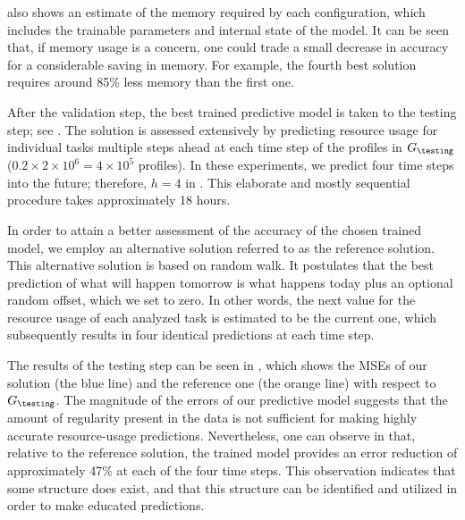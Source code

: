  also shows an estimate of the memory required by each
configuration, which includes the trainable parameters and internal state of the
model. It can be seen that, if memory usage is a concern, one could trade a
small decrease in accuracy for a considerable saving in memory. For example, the
fourth best solution requires around 85\% less memory than the first one.

After the validation step, the best trained predictive model is taken to the
testing step; see . The solution is assessed extensively by
predicting resource usage for individual tasks multiple steps ahead at each time
step of the profiles in $G_\testing$ ($0.2 \times 2 \times 10^6 = 4 \times 10^5$
profiles). In these experiments, we predict four time steps into the future;
therefore, $h = 4$ in . This elaborate and mostly sequential
procedure takes approximately 18 hours.

In order to attain a better assessment of the accuracy of the chosen trained
model, we employ an alternative solution referred to as the reference solution.
This alternative solution is based on random walk. It postulates that the best
prediction of what will happen tomorrow is what happens today plus an optional
random offset, which we set to zero. In other words, the next value for the
resource usage of each analyzed task is estimated to be the current one, which
subsequently results in four identical predictions at each time step.

The results of the testing step can be seen in , which shows
the \acp{MSE} of our solution (the blue line) and the reference one (the orange
line) with respect to $G_\testing$. The magnitude of the errors of our
predictive model suggests that the amount of regularity present in the data is
not sufficient for making highly accurate resource-usage predictions.
Nevertheless, one can observe in  that, relative to the
reference solution, the trained model provides an error reduction of
approximately 47\% at each of the four time steps. This observation indicates
that some structure does exist, and that this structure can be identified and
utilized in order to make educated predictions.
